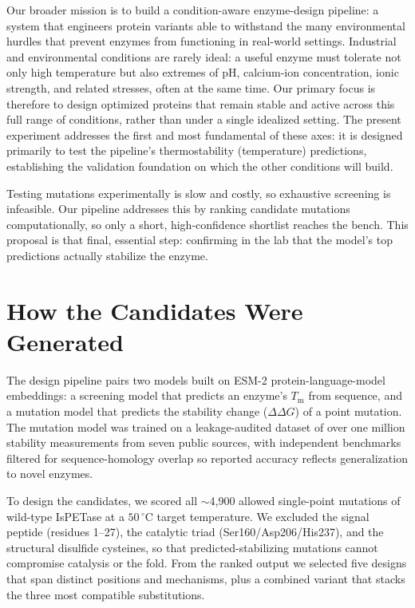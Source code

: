 \documentclass[11pt]{article}
\begin{document}
Our broader mission is to build a condition-aware enzyme-design pipeline: a system that
engineers protein variants able to withstand the many environmental hurdles that prevent enzymes
from functioning in real-world settings. Industrial and environmental conditions are rarely
ideal: a useful enzyme must tolerate not only high temperature but also extremes of pH,
calcium-ion concentration, ionic strength, and related stresses, often at the same time. Our
primary focus is therefore to design optimized proteins that remain stable and active across this
full range of conditions, rather than under a single idealized setting. The present experiment
addresses the first and most fundamental of these axes: it is designed primarily to test the
pipeline's thermostability (temperature) predictions, establishing the validation foundation on
which the other conditions will build.

Testing mutations experimentally is slow and costly, so exhaustive screening is infeasible.
Our pipeline addresses this by ranking candidate mutations computationally, so only a short,
high-confidence shortlist reaches the bench. This proposal is that final, essential step:
confirming in the lab that the model's top predictions actually stabilize the enzyme.

\section{How the Candidates Were Generated}
The design pipeline pairs two models built on ESM-2 protein-language-model embeddings: a
screening model that predicts an enzyme's $T_\mathrm{m}$ from sequence, and a mutation model
that predicts the stability change ($\Delta\Delta G$) of a point mutation. The mutation model
was trained on a leakage-audited dataset of over one million stability measurements from seven
public sources, with independent benchmarks filtered for sequence-homology overlap so reported
accuracy reflects generalization to novel enzymes.

To design the candidates, we scored all $\sim$4{,}900 allowed single-point mutations of
wild-type IsPETase at a $50\,^{\circ}$C target temperature. We excluded the signal peptide
(residues 1--27), the catalytic triad (Ser160/Asp206/His237), and the structural disulfide
cysteines, so that predicted-stabilizing mutations cannot compromise catalysis or the fold.
From the ranked output we selected five designs that span distinct positions and mechanisms,
plus a combined variant that stacks the three most compatible substitutions.
\end{document}
